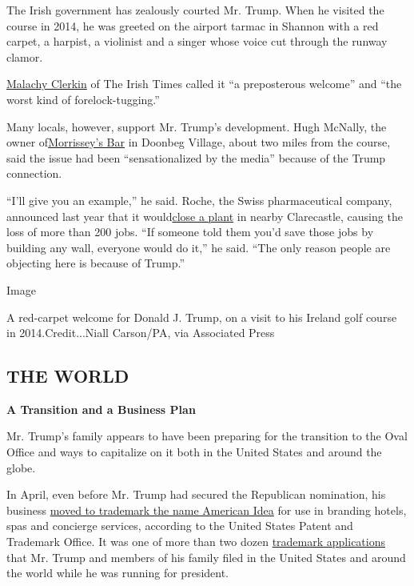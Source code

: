 The Irish government has zealously courted Mr. Trump. When he visited
the course in 2014, he was greeted on the airport tarmac in Shannon with
a red carpet, a harpist, a violinist and a singer whose voice cut
through the runway clamor.

\href{http://www.irishtimes.com/sport/golf/doonbeg-s-good-news-hardly-worth-the-bowing-and-scraping-1.1792515}{Malachy
Clerkin} of The Irish Times called it ``a preposterous welcome'' and
``the worst kind of forelock-tugging.''

Many locals, however, support Mr. Trump's development. Hugh McNally, the
owner of\href{http://morrisseysdoonbeg.ie/}{Morrissey's Bar} in Doonbeg
Village, about two miles from the course, said the issue had been
``sensationalized by the media'' because of the Trump connection.

``I'll give you an example,'' he said. Roche, the Swiss pharmaceutical
company, announced last year that it
would\href{http://www.irishtimes.com/business/health-pharma/roche-close-irish-plant-with-240-job-losses-1.2427527}{close
a plant} in nearby Clarecastle, causing the loss of more than 200 jobs.
``If someone told them you'd save those jobs by building any wall,
everyone would do it,'' he said. ``The only reason people are objecting
here is because of Trump.''

Image

A red-carpet welcome for Donald J. Trump, on a visit to his Ireland golf
course in 2014.Credit...Niall Carson/PA, via Associated Press

\hypertarget{the-world}{%
\subsection{THE WORLD}\label{the-world}}

\textbf{A Transition and a Business Plan}

Mr. Trump's family appears to have been preparing for the transition to
the Oval Office and ways to capitalize on it both in the United States
and around the globe.

In April, even before Mr. Trump had secured the Republican nomination,
his business
\href{https://trademarks.justia.com/869/70/american-86970999.html}{moved
to trademark the name American Idea} for use in branding hotels, spas
and concierge services, according to the United States Patent and
Trademark Office. It was one of more than two dozen
\href{https://www.documentcloud.org/documents/3225269-Trump-Trademark-Applications-Merged.html}{trademark
applications} that Mr. Trump and members of his family filed in the
United States and around the world while he was running for president.

